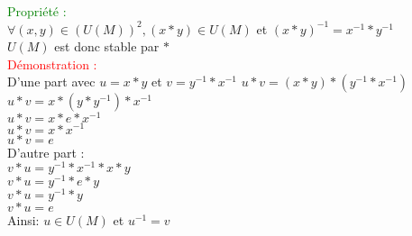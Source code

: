 \documentclass{article}
\begin{document}
	\textcolor{green}{Propriété :} \\ $\forall (x,y) \in (U(M))^2, ( x \ast y) \in U(M)$ et $(x \ast y)^{-1} = x^{-1} \ast y^{-1}$ \\
	$U(M)$ est donc stable par $\ast$ \\
	\textcolor{red}{Démonstration :} \\ D'une part avec $u= x \ast y$ et $v=y^{-1}\ast x^{-1}$ 
$u \ast v = (x \ast y) \ast (y^{-1} \ast x^{-1})$\\
$u \ast v= x \ast (y \ast y^{-1}) \ast x^{-1}$ \\
$u \ast v= x \ast e \ast x^{-1}$ \\
$u \ast v= x \ast x^{-1}$ \\
$u \ast v= e$ \\
D'autre part : \\ 
$v \ast u = y^{-1} \ast x^{-1} \ast x \ast y$ \\
$v \ast u=y^{-1} \ast e \ast y$ \\
$v \ast u= y^{-1} \ast y$ \\
$v \ast u= e$ \\
Ainsi: $ u \in U(M)$ et $u^{-1}=v$ \\ 
\end{document}
